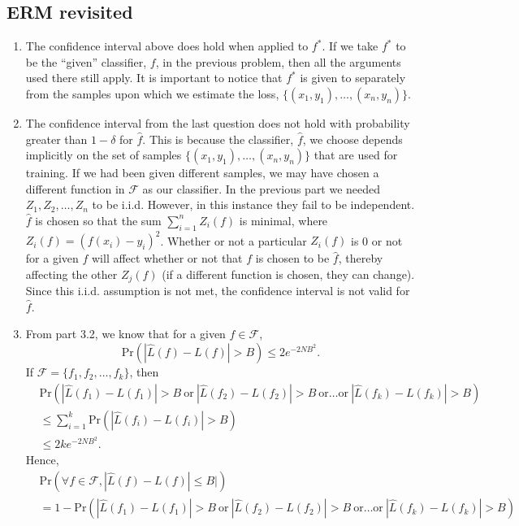 \documentclass{article}
\begin{document}
\subsection{ERM revisited}
\begin{enumerate}
	\item The confidence interval above does hold when applied to $f^*$. If we take $f^*$ to be the ``given'' classifier, $f$, in the previous problem, then all the arguments used there still apply. It is important to notice that $f^*$ is given to separately from the samples upon which we estimate the loss, $\{(x_1,y_1),\dots,(x_n,y_n)\}$.
	\item The confidence interval from the last question does not hold with probability greater than $1-\delta$ for $\hat f$. This is because the classifier, $\hat f$, we choose depends implicitly on the set of samples $\{(x_1,y_1),\dots,(x_n,y_n)\}$ that are used for training. If we had been given different samples, we may have chosen a different function in $\mathcal{F}$ as our classifier. In the previous part we needed $Z_1,Z_2,\dots,Z_n$ to be i.i.d. However, in this instance they fail to be independent. $\hat f$ is chosen so that the sum $\sum^n_{i=1}Z_i(f)$ is minimal, where $Z_i(f) = (f(x_i)-y_i)^2$. Whether or not a particular $Z_i(f)$ is 0 or not for a given $f$ will affect whether or not that $f$ is chosen to be $\hat f$, thereby affecting the other $Z_j(f)$ (if a different function is chosen, they can change). Since this i.i.d. assumption is not met, the confidence interval is not valid for $\hat f$.
	\item From part 3.2, we know that for a given $f\in\mathcal{F}$, 
	\[
		\mathrm{Pr}\left(|\hat L(f)-L(f)|>B \right)\leq 2e^{-2NB^2}.
	\]
	If $\mathcal{F} = \{f_1,f_2,\dots,f_k\}$, then 
	\begin{align*}
		&\mathrm{Pr}\left(|\hat L(f_1)-L(f_1)|>B~\mathrm{or}~|\hat L(f_2)-L(f_2)|>B~\mathrm{or}\dots\mathrm{or}~|\hat L(f_k)-L(f_k)|>B \right)\\
		&\leq \sum^k_{i=1}\mathrm{Pr}\left(|\hat L(f_i)-L(f_i)|>B\right) \\
		&\leq  2ke^{-2NB^2}.
	\end{align*}
	Hence,
	\begin{align*}
		&\mathrm{Pr}\left(\forall f\in\mathcal{F},|\hat L(f)-L(f)|\leq B|\right)\\
		&= 1 - \mathrm{Pr}\left(|\hat L(f_1)-L(f_1)|>B~\mathrm{or}~|\hat L(f_2)-L(f_2)|>B~\mathrm{or}\dots\mathrm{or}~|\hat L(f_k)-L(f_k)|>B \right) \\

\end{align*}
\end{enumerate}
\end{document}
